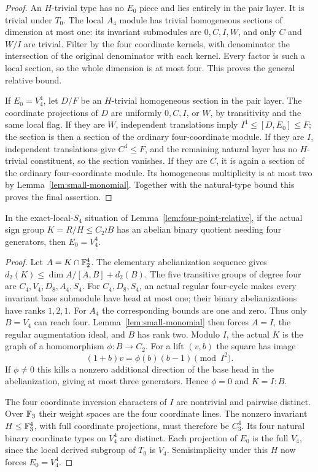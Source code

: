 \begin{proof}
An $H$-trivial type has no $E_0$ piece and lies entirely in the pair
layer. It is trivial under $T_0$. The local $A_4$ module has trivial
homogeneous sections of dimension at most one: its invariant
submodules are $0,C,I,W$, and only $C$ and $W/I$ are trivial.
Filter by the four coordinate kernels, with denominator the
intersection of the original denominator with each kernel. Every
factor is such a local section, so the whole dimension is at most
four. This proves the general relative bound.

If $E_0=V_4^4$, let $D/F$ be an $H$-trivial homogeneous section in
the pair layer. The coordinate projections of $D$ are uniformly
$0,C,I$, or $W$, by transitivity and the same local flag. If they
are $W$, independent translations imply $I^4\leq[D,E_0]\leq F$;
the section is then a section of the ordinary four-coordinate
module. If they are $I$, independent translations give $C^4\leq F$,
and the remaining natural layer has no $H$-trivial constituent,
so the section vanishes. If they are $C$, it is again a section
of the ordinary four-coordinate module. Its homogeneous multiplicity
is at most two by Lemma~\ref{lem:small-monomial}. Together with the
natural-type bound this proves the final assertion.
\end{proof}

\begin{lemma}\label{lem:four-sign-boundary}
In the exact-local-$S_4$ situation of Lemma~\ref{lem:four-point-relative},
if the actual sign group $K=R/H\leq C_2\wr B$ has an abelian binary
quotient needing four generators, then $E_0=V_4^4$.
\end{lemma}
\begin{proof}
Let $A=K\cap\mathbb F_2^4$. The elementary abelianization sequence gives
$d_2(K)\leq\dim A/[A,B]+d_2(B)$. The five transitive groups of
degree four are $C_4,V_4,D_8,A_4,S_4$. For $C_4,D_8,S_4$, an actual
regular four-cycle makes every invariant base submodule have head
at most one; their binary abelianizations have ranks $1,2,1$.
For $A_4$ the corresponding bounds are one and zero. Thus only
$B=V_4$ can reach four. Lemma~\ref{lem:small-monomial} then forces
$A=I$, the regular augmentation ideal, and $B$ has rank two.
Modulo $I$, the actual $K$ is the graph of a homomorphism
$\phi:B\to C_2$. For a lift $(v,b)$ the square has image
\[
 (1+b)v=\phi(b)(b-1)\pmod{I^2}.
\]
If $\phi\ne0$ this kills a nonzero additional direction of the
base head in the abelianization, giving at most three generators.
Hence $\phi=0$ and $K=I:B$.

The four coordinate inversion characters of $I$ are nontrivial and
pairwise distinct. Over $\mathbb F_3$ their weight spaces are the four
coordinate lines. The nonzero invariant $H\leq\mathbb F_3^4$, with full
coordinate projections, must therefore be $C_3^4$. Its four natural
binary coordinate types on $V_4^4$ are distinct. Each projection of
$E_0$ is the full $V_4$, since the local derived subgroup of $T_0$
is $V_4$. Semisimplicity under this $H$ now forces $E_0=V_4^4$.
\end{proof}

